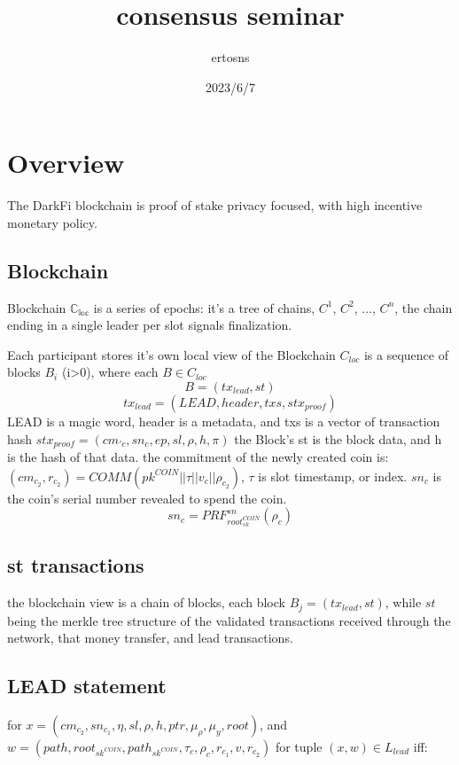 \documentclass{article}
\begin{document}
\title {consensus seminar}
\author {ertosns}
\date {2023/6/7}
\maketitle

\section{ Overview}

The DarkFi blockchain is  proof of stake  privacy focused, with high incentive monetary policy.

\subsection{ Blockchain}

 Blockchain $\mathbb{C_{loc}}$ is a series of epochs: it's a tree of chains,
$C^1$, $C^2$, $\dots$, $C^n$, the chain ending in a single leader per slot signals finalization.


Each participant stores it's own local view of the Blockchain $C_{loc}$ is a sequence of blocks $B_i$ (i>0), where each $B \in C_{loc}$
$$ B = (tx_{lead},st)$$
$$tx_{lead} = (LEAD, header, txs, stx_{proof})$$
LEAD is a magic word, header is a metadata, and txs is a vector of transaction hash
$stx_{proof}=(cm_{\prime{c}},sn_c,ep,sl,\rho,h,\pi)$
the Block's st is the block data, and h is the hash of that data.
the commitment of the newly created coin is:
$(cm_{c_2},r_{c_2})=COMM(pk^{COIN}||\tau||v_c||\rho_{c_2})$,
$\tau$ is slot timestamp, or index. $sn_c$ is the coin's serial number revealed to spend the coin.
$$sn_c=PRF_{root_{sk}^{COIN}}^{sn}(\rho_c)$$


\subsection{ st transactions}
the blockchain view is a chain of blocks, each block $B_j=(tx_{lead},st)$, while $st$ being the merkle tree structure of the validated transactions received through the network, that money transfer, and lead transactions.

\subsection{ LEAD statement}
for $x=(cm_{c_2},sn_{c_1},\eta,sl,\rho,h,ptr,\mu_{\rho},\mu_{y},root)$, and
\newline
$w=(path,root_{sk^{COIN}},path_{sk^{COIN}},\tau_c,\rho_c,r_{c_1},v,r_{c_2})$
for tuple $(x,w) \in L_{lead}$ iff:
\end{document}
